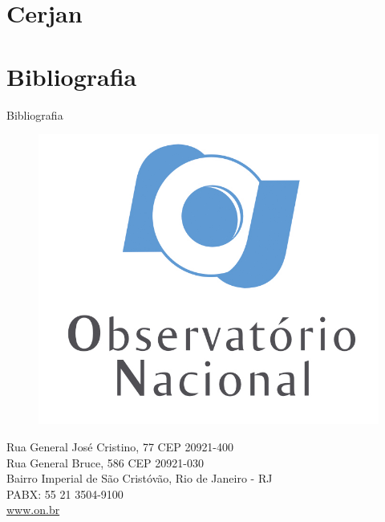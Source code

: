 \documentclass[10pt]{beamer} %
\newcommand{\nologo}{\setbeamertemplate{logo}{}} %
\begin{document}
\section{Cerjan}



\section{Bibliografia}
	\begin{frame}[allowframebreaks]{Bibliografia}
	\beamertemplatetextbibitems
	\tiny
	
	
	\end{frame}

\makeatother
{\nologo
\begin{frame}
\begin{figure}
\includegraphics[scale=0.25]{Imagens/logonvertical.jpg}
\end{figure}
\begin{center}
\begin{minipage}{0.77\textwidth}
\small
\begin{center}
Rua General José Cristino, 77 CEP 20921-400\\
Rua General Bruce, 586 CEP 20921-030\\
Bairro Imperial de São Cristóvão, Rio de Janeiro - RJ\\
PABX: 55 21 3504-9100\\
\url{www.on.br}
\end{center}
\end{minipage}
\end{center}
\end{frame}
}
\end{document}
